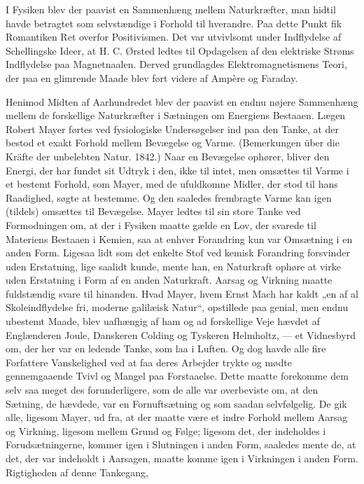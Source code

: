 \documentclass[12pt,a4paper,openany]{book}
\newcommand{\opage}[1]{\marginnote{\footnotesize\textit{[#1]}}}
\begin{document}
\opage{27}I Fysiken blev der paavist en Sammenhæng mellem Naturkræfter,
man hidtil havde betragtet som selvstændige i Forhold til hverandre.
Paa dette Punkt fik Romantiken Ret overfor Positivismen. Det var
utvivlsomt under Indflydelse af Schellingske Ideer, at H. C. Ørsted
ledtes til Opdagelsen af den elektriske Strøms Indflydelse paa Magnetnaalen.
Derved grundlagdes Elektromagnetismens Teori, der paa
en glimrende Maade blev ført videre af Ampère og Faraday.

Henimod Midten af Aarhundredet blev der paavist en endnu
nøjere Sammenhæng mellem de forskellige Naturkræfter i Sætningen
om Energiens Bestaaen. Lægen Robert Mayer førtes ved fysiologiske
Undersøgelser ind paa den Tanke, at der bestod et exakt
Forhold mellem Bevægelse og Varme. (Bemerkungen über die
Kräfte der unbelebten Natur. 1842.) Naar en Bevægelse ophører, bliver
den Energi, der har fundet sit Udtryk i den, ikke til intet, men
omsættes til Varme i et bestemt Forhold, som Mayer, med de ufuldkomne
Midler, der stod til hans Raadighed, søgte at bestemme. Og
den saaledes frembragte Varme kan igen (tildels) omsættes til Bevægelse.
Mayer ledtes til sin store Tanke ved Formodningen om, at
der i Fysiken maatte gælde en Lov, der svarede til Materiens Bestaaen
i Kemien, saa at enhver Forandring kun var Omsætning i en
anden Form. Ligesaa lidt som det enkelte Stof ved kemisk Forandring
forsvinder uden Erstatning, lige saalidt kunde, mente han, en
Naturkraft ophøre at virke uden Erstatning i Form af en anden Naturkraft.
Aarsag og Virkning maatte fuldstændig svare til hinanden.
Hvad Mayer, hvem Ernst Mach har kaldt „en af al Skoleindflydelse
fri, moderne galilæisk Natur“, opstillede paa genial, men endnu ubestemt
Maade, blev uafhængig af ham og ad forskellige Veje hævdet
af Englænderen Joule, Danskeren Colding og Tyskeren Helmholtz,
--- et Vidnesbyrd om, der her var en ledende Tanke, som laa i Luften.
Og dog havde alle fire Forfattere Vanskelighed ved at faa deres
Arbejder trykte og mødte gennemgaaende Tvivl og Mangel paa Forstaaelse.
Dette maatte forekomme dem selv saa meget des forunderligere,
som de alle var overbeviste om, at den Sætning, de hævdede,
var en Fornuftsætning og som saadan selvfølgelig. De gik alle, ligesom
Mayer, ud fra, at der maatte være et indre Forhold mellem Aarsag
og Virkning, ligesom mellem Grund og Følge; ligesom det, der
indeholdes i Forudsætningerne, kommer igen i Slutningen i anden
Form, saaledes mente de, at det, der var indeholdt i Aarsagen, maatte
komme igen i Virkningen i anden Form. Rigtigheden af denne Tankegang,
\end{document}
